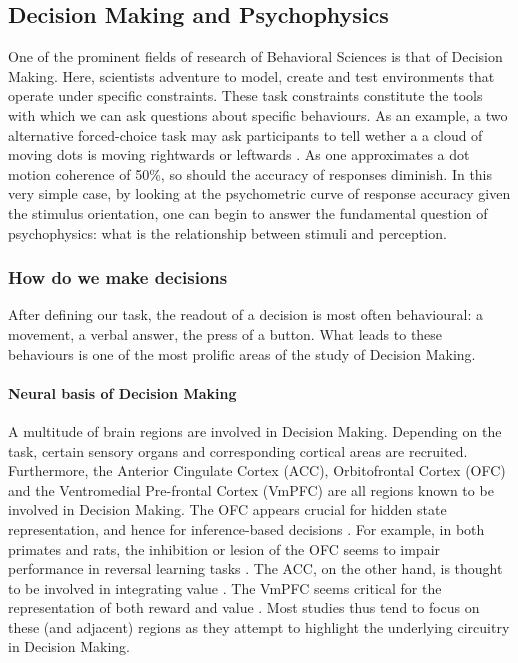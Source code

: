 \documentclass[11pt]{article}
\begin{document}
\subsection{Decision Making and Psychophysics}
One of the prominent fields of research of Behavioral Sciences is that of Decision Making. Here, scientists adventure to model, create and test environments that operate under specific constraints. These task constraints constitute the tools with which we can ask questions about specific behaviours. As an example, a two alternative forced-choice task may ask participants to tell wether a a cloud of moving dots is moving rightwards or leftwards \cite{newsome1989neuronal}. As one approximates a dot motion coherence of 50\%, so should the accuracy of responses diminish. In this very simple case, by looking at the psychometric curve of response accuracy given the stimulus orientation, one can begin to answer the fundamental question of psychophysics: what is the relationship between stimuli and perception.
\subsubsection{How do we make decisions}
After defining our task, the readout of a decision is most often behavioural: a movement, a verbal answer, the press of a button. What leads to these behaviours is one of the most prolific areas of the study of Decision Making.
\paragraph{Neural basis of Decision Making}\label{neural_basis}
A multitude of brain regions are involved in Decision Making. Depending on the task, certain sensory organs and corresponding cortical areas are recruited. Furthermore, the Anterior Cingulate Cortex (ACC), Orbitofrontal Cortex (OFC) and the Ventromedial Pre-frontal Cortex (VmPFC) are all regions known to be involved in Decision Making. The OFC appears crucial for hidden state representation, and hence for inference-based decisions \cite{rolls2004functions} \cite{vertechi2020inference}. For example, in both primates and rats, the inhibition or lesion of the OFC seems to impair performance in reversal learning tasks \cite{wilson2014orbitofrontal}. The ACC, on the other hand, is thought to be involved in integrating value \cite{williams2004human}. The VmPFC seems critical for the representation of both reward and value \cite{hiser2018multifaceted}.
Most studies thus tend to focus on these (and adjacent) regions as they attempt to highlight the underlying circuitry in Decision Making.
\end{document}
